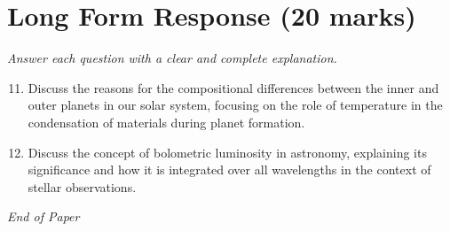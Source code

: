 \documentclass[12pt]{article}
\begin{document}
\section*{Long Form Response (20 marks)}
\textit{Answer each question with a clear and complete explanation.}
\begin{enumerate}[label=\arabic*.]
\setcounter{enumi}{10}
\item Discuss the reasons for the compositional differences between the inner and outer planets in our solar system, focusing on the role of temperature in the condensation of materials during planet formation.
\item Discuss the concept of bolometric luminosity in astronomy, explaining its significance and how it is integrated over all wavelengths in the context of stellar observations.
\end{enumerate}

\vfill
\noindent\textit{End of Paper}
\end{document}
